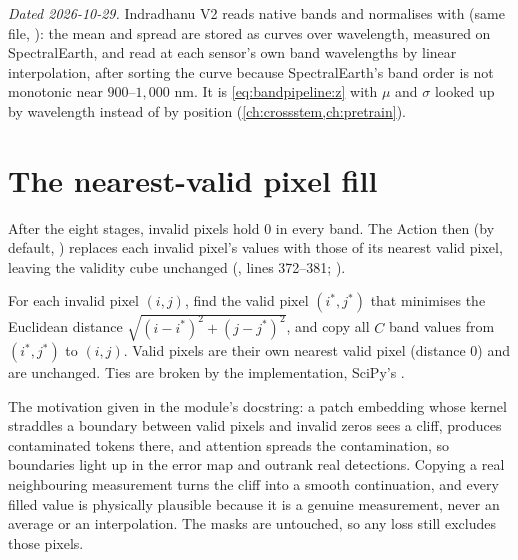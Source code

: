 \begin{drift}
\emph{Dated 2026-10-29.} Indradhanu V2 reads native bands and normalises with
 (same file, ): the mean and spread are stored as
curves over wavelength, measured on SpectralEarth, and read at each sensor's own band wavelengths by
linear interpolation, after sorting the curve because SpectralEarth's band order is not monotonic
near $900$--$1{,}000$ nm. It is \cref{eq:bandpipeline:z} with $\mu$ and $\sigma$ looked up by
wavelength instead of by position (\cref{ch:crossstem,ch:pretrain}).
\end{drift}


\section{The nearest-valid pixel fill}\label{sec:bandpipeline:fill}

After the eight stages, invalid pixels hold $0$ in every band. The  Action
then (by default, ) replaces each invalid pixel's values with
those of its nearest valid pixel, leaving the validity cube unchanged
(, lines 372--381;
).

\begin{definition}
For each invalid pixel $(i,j)$, find the valid pixel $(i^*, j^*)$ that minimises the Euclidean
distance $\sqrt{(i - i^*)^2 + (j - j^*)^2}$, and copy all $C$ band values from $(i^*, j^*)$ to
$(i,j)$. Valid pixels are their own nearest valid pixel (distance $0$) and are unchanged. Ties are
broken by the implementation, SciPy's .
\end{definition}

The motivation given in the module's docstring: a patch embedding whose kernel straddles a boundary
between valid pixels and invalid zeros sees a cliff, produces contaminated tokens there, and
attention spreads the contamination, so boundaries light up in the error map and outrank real
detections. Copying a real neighbouring measurement turns the cliff into a smooth continuation, and
every filled value is physically plausible because it is a genuine measurement, never an average or
an interpolation. The masks are untouched, so any loss still excludes those pixels.

